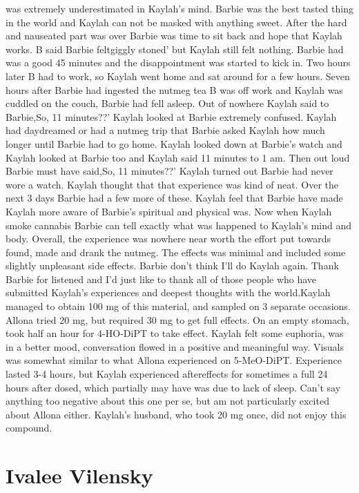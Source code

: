 \documentclass[12pt]{book}
\begin{document}
was extremely underestimated in Kaylah's mind. Barbie was the best tasted thing in the world and Kaylah can not be masked with anything sweet. After the hard and nauseated part was over Barbie was time to sit back and hope that Kaylah works. B said Barbie feltgiggly stoned' but Kaylah still felt nothing. Barbie had was a good 45 minutes and the disappointment was started to kick in. Two hours later B had to work, so Kaylah went home and sat around for a few hours. Seven hours after Barbie had ingested the nutmeg tea B was off work and Kaylah was cuddled on the couch, Barbie had fell asleep. Out of nowhere Kaylah said to Barbie,So, 11 minutes??' Kaylah looked at Barbie extremely confused. Kaylah had daydreamed or had a nutmeg trip that Barbie asked Kaylah how much longer until Barbie had to go home. Kaylah looked down at Barbie's watch and Kaylah looked at Barbie too and Kaylah said 11 minutes to 1 am. Then out loud Barbie must have said,So, 11 minutes??' Kaylah turned out Barbie had never wore a watch. Kaylah thought that that experience was kind of neat. Over the next 3 days Barbie had a few more of these. Kaylah feel that Barbie have made Kaylah more aware of Barbie's spiritual and physical was. Now when Kaylah smoke cannabis Barbie can tell exactly what was happened to Kaylah's mind and body. Overall, the experience was nowhere near worth the effort put towards found, made and drank the nutmeg. The effects was minimal and included some slightly unpleasant side effects. Barbie don't think I'll do Kaylah again. Thank Barbie for listened and I'd just like to thank all of those people who have submitted Kaylah's experiences and deepest thoughts with the world.Kaylah managed to obtain 100 mg of this material, and sampled on 3 separate occasions. Allona tried 20 mg, but required 30 mg to get full effects. On an empty stomach, took half an hour for 4-HO-DiPT to take effect. Kaylah felt some euphoria, was in a better mood, conversation flowed in a positive and meaningful way. Visuals was somewhat similar to what Allona experienced on 5-MeO-DiPT. Experience lasted 3-4 hours, but Kaylah experienced aftereffects for sometimes a full 24 hours after dosed, which partially may have was due to lack of sleep. Can't say anything too negative about this one per se, but am not particularly excited about Allona either. Kaylah's husband, who took 20 mg once, did not enjoy this compound.



\chapter{Ivalee Vilensky}
\end{document}
